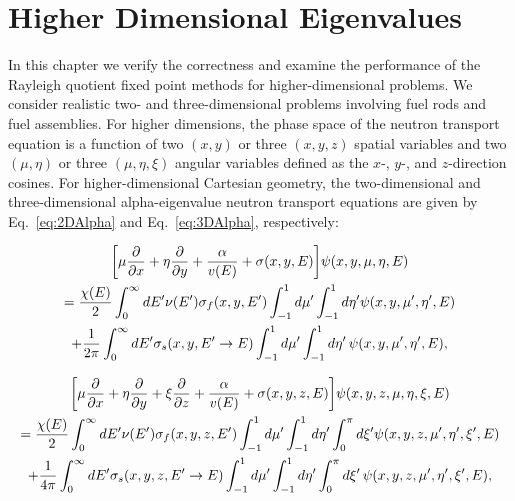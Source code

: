 \chapter{Higher Dimensional Eigenvalues}

In this chapter we verify the correctness and examine the performance of the Rayleigh quotient fixed point methods for higher-dimensional problems. We consider realistic two- and three-dimensional problems involving fuel rods and fuel assemblies. For higher dimensions, the phase space of the neutron transport equation is a function of two $(x, y)$ or three $(x, y, z)$ spatial variables and two $(\mu, \eta)$ or three $(\mu, \eta, \xi)$ angular variables defined as the $x$-, $y$-, and $z$-direction cosines. For higher-dimensional Cartesian geometry, the two-dimensional and three-dimensional alpha-eigenvalue neutron transport equations are given by Eq.~\ref{eq:2DAlpha} and Eq.~\ref{eq:3DAlpha}, respectively:

\begin{multline}
\bigg [ \mu \frac{\partial}{\partial x} + \eta \frac{\partial}{\partial y} + \frac{\alpha}{v(E)} + \sigma(x,y,E) \bigg ] \psi(x,y,\mu,\eta,E) \\ = \frac{\chi(E)}{2} \int_{0}^{\infty} \mathop{}\!d E' \nu(E') \sigma_{f}(x,y,E') \int_{-1}^{1} \mathop{}\!d \mu' \int_{-1}^{1} \mathop{}\!d \eta' \psi(x,y, \mu',\eta', E) \\ + \frac{1}{2\pi} \int_{0}^{\infty} \mathop{}\!d E' \sigma_{s}(x, y, E' \rightarrow E) \int_{-1}^{1} \mathop{}\!d \mu' \int_{-1}^{1} \mathop{}\!d \eta' \, \psi(x,y, \mu',\eta',E),
\label{eq:2DAlpha}
\end{multline}

\begin{multline}
\bigg [ \mu \frac{\partial}{\partial x} + \eta \frac{\partial}{\partial y} + \xi \frac{\partial}{\partial z} + \frac{\alpha}{v(E)} + \sigma(x,y,z,E) \bigg ] \psi(x,y,z,\mu,\eta,\xi, E) \\ = \frac{\chi(E)}{2} \int_{0}^{\infty} \diff E' \nu(E') \sigma_{f}(x,y,z,E') \int_{-1}^{1} \diff \mu' \int_{-1}^{1} \diff \eta' \int_{0}^{\pi} \diff \xi' \psi(x,y,z, \mu',\eta', \xi',E) \\ + \frac{1}{4\pi} \int_{0}^{\infty} \diff E' \sigma_{s}(x, y,z, E' \rightarrow E) \int_{-1}^{1} \diff \mu' \int_{-1}^{1} \diff \eta' \int_{0}^{\pi} \diff \xi' \, \psi(x,y,z, \mu',\eta',\xi',E),
\label{eq:3DAlpha}
\end{multline}


